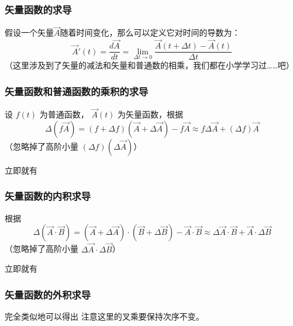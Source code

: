 \documentclass[CJK,13pt]{beamer}
\date{}
\begin{document}
  \bch



\begin{frame}
  \frametitle{矢量函数的求导}

  假设一个矢量$\vec{A}$随着时间变化，那么可以定义它对时间的导数为：
  $$\vec{A}'(t) = \frac{d\vec{A}}{dt} = \lim_{\Delta t\rightarrow 0}\frac{\vec{A}(t+\Delta t) - \vec{A}(t)}{\Delta t}$$
  （这里涉及到了矢量的减法和矢量和普通数的相乘，我们都在小学学习过……吧）
  
\end{frame}


\begin{frame}
  \frametitle{矢量函数和普通函数的乘积的求导}
  设 $f(t)$ 为普通函数， $\vec{A}(t)$ 为矢量函数，根据
  $$ \Delta(f\vec{A}) = (f+\Delta f)(\vec{A}+\Delta\vec{A})- f \vec{A}  \approx f\Delta\vec{A} + (\Delta f) \vec{A} $$
  （忽略掉了高阶小量 $(\Delta f)(\Delta\vec{A})$）

  立即就有
  
  
\end{frame}


\begin{frame}
  \frametitle{矢量函数的内积求导}
  根据
  $$ \Delta(\vec{A}\cdot\vec{B}) = (\vec{A}+\Delta\vec{A})\cdot (\vec{B}+\Delta\vec{B}) - \vec{A}\cdot \vec{B}  \approx \Delta \vec{A}\cdot \vec{B} + \vec{A}\cdot\Delta\vec{B} $$
  （忽略掉了高阶小量 $\Delta\vec{A}\cdot\Delta\vec{B}$）

  立即就有
  
  
\end{frame}

\begin{frame}
  \frametitle{矢量函数的外积求导}
  完全类似地可以得出  
  注意这里的叉乘要保持次序不变。
  
\end{frame}

\end{document}
